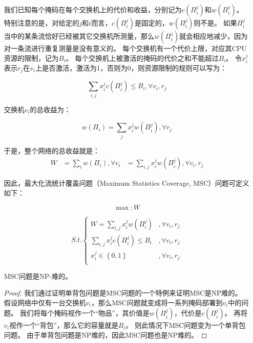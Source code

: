 我们已知每个掩码在每个交换机上的代价和收益，分别记为$c(\Pi^j_i)$和$w(\Pi^j_i)$。
特别注意的是，对给定的$j$和$i$而言，$c(\Pi^j_i)$是固定的，$w(\Pi^j_i)$则不是。
如果$\Pi^j_i$当中的某条流恰好已经被其它交换机所测量，那么$w(\Pi^j_i)$就会相应地减少，因为对一条流进行重复测量是没有意义的。
每个交换机有一个代价上限，对应其CPU资源的限制，记为$B_i$。
每个交换机上被激活的掩码的代价之和不能超过$B_i$。
令$x_i^j$表示$r_j$在$v_i$上是否激活，激活为1，否则为0，则资源限制的规则可以写为：

\begin{equation}
    \sum_{i,j} x_i^j c(\Pi^j_i) \le B_i, \forall v_i,r_j   
\end{equation}

交换机$v_i$的总收益为：

\begin{equation}
    w(\Pi_i) = \sum_{j} x_i^j w(\Pi^j_i), \forall r_j
\end{equation}

于是，整个网络的总收益就是：
\begin{equation}
\begin{aligned}
    W &= \sum_i w(\Pi_i), \forall v_i
      &= \sum_{i,j} x_i^j w(\Pi^j_i), \forall v_i,r_j
\end{aligned}
\end{equation}

因此，最大化流统计覆盖问题（Maximum Statistics Coverage, MSC）问题可定义如下：

\begin{equation*}
\max :  W
\end{equation*}

\begin{equation}\label{eq:msc}
{S.t.}
\begin{cases}
W = \sum_{i,j} x_i^j w(\Pi^j_i) &, \forall v_i,r_j\\
\sum_{i,j} x_i^j c(\Pi^j_i) \le B_i &, \forall v_i,r_j   \\
x^j_{i}\in \left\{ {0,1} \right\} &,   \forall v_i,r_j  \\
\end{cases}
\end{equation}

\begin{theorem}\label{thm:nphard}
    MSC问题是NP-难的。
\end{theorem}

\begin{proof}
我们通过证明单背包问题\cite{ingargiola1973reduction}是MSC问题的一个特例来证明MSC是NP难的。
假设网络中仅有一台交换机$v_i$，那么MSC问题就变成将一系列掩码部署到$v_i$中的问题。
我们将每个掩码视作一个“物品”，其价值是$w(\Pi^j_i)$，代价是$c(\Pi^j_i)$。
再将$v_i$视作一个“背包”，那么它的容量就是$B_i$。
则此情况下MSC问题变为一个单背包问题。
由于单背包问题是NP难的\cite{ingargiola1973reduction}，因此MSC问题也是NP难的。
\end{proof}


